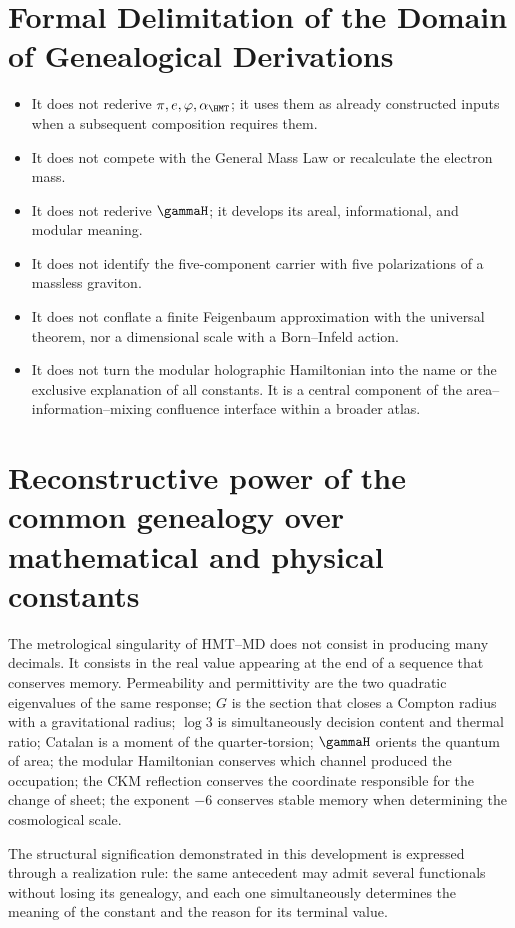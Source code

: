 \section{Formal Delimitation of the Domain of Genealogical Derivations}

\begin{itemize}
\item It does not rederive \(\pi,e,\varphi,\alpha_{\HMT}\); it uses them as already
constructed inputs when a subsequent composition requires them.
\item It does not compete with the General Mass Law or recalculate the electron mass.
\item It does not rederive \(\gammaH\); it develops its areal,
informational, and modular meaning.
\item It does not identify the five-component carrier with five polarizations
of a massless graviton.
\item It does not conflate a finite Feigenbaum approximation with the universal
theorem, nor a dimensional scale with a Born--Infeld action.
\item It does not turn the modular holographic Hamiltonian into the name or the
exclusive explanation of all constants. It is a central component of the
area--information--mixing confluence interface within a broader atlas.
\end{itemize}

\section{Reconstructive power of the common genealogy over mathematical and physical constants}

The metrological singularity of HMT--MD does not consist in producing many
decimals. It consists in the real value appearing at the end of a sequence that
conserves memory. Permeability and permittivity are the two quadratic eigenvalues
of the same response; \(G\) is the section that closes a Compton
radius with a gravitational radius; \(\log3\) is simultaneously decision
content and thermal ratio; Catalan is a moment of the quarter-torsion;
\(\gammaH\) orients the quantum of area; the modular Hamiltonian conserves which
channel produced the occupation; the CKM reflection conserves the coordinate
responsible for the change of sheet; the
exponent \(-6\) conserves stable memory when determining the cosmological scale.

\begin{proposition}
The structural signification demonstrated in this development is expressed
through a realization rule: the same antecedent may admit
several functionals without losing its genealogy, and each one simultaneously
determines the meaning of the constant and the reason for its
terminal value.
\end{proposition}

